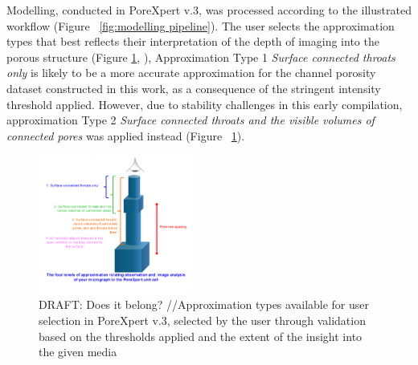 \documentclass[3p,twocolumn]{elsarticle}
\begin{document}
    Modelling, conducted in PoreXpert v.3, was processed according to the
    illustrated workflow (Figure ~\ref{fig:modelling pipeline}). The user
    selects the approximation types that best reflects their interpretation of
    the depth of imaging into the porous structure (Figure
    \ref{fig:pxapproxtypes}, \citep{MatthewsPoreXpert2025}), Approximation Type
    1 \textit{Surface connected throats only} is likely to be a more accurate
    approximation for the channel porosity dataset constructed in this work, as
    a consequence of the stringent intensity threshold applied. However, due to
    stability challenges in this early compilation, approximation Type 2
    \textit{Surface connected throats and the visible volumes of connected
    pores} was applied instead (Figure ~\ref{fig:pxapproxtypes}).
    

    \begin{figure}
	    \centering
	    \includegraphics[width=0.45\textwidth]{./Media/PX Approximation Types.png}
	    \caption{DRAFT: Does it belong? //Approximation types available for user selection in PoreXpert v.3, selected by the user through validation based on the thresholds applied and the extent of the insight into the given media }
	    \label{fig:pxapproxtypes}
	\end{figure}
\end{document}
